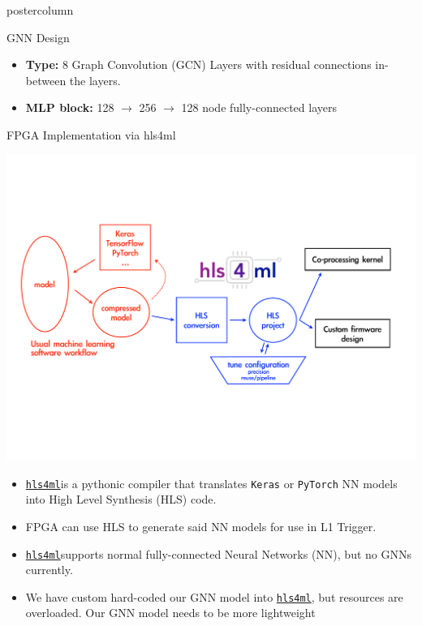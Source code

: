 \documentclass[final,hyperref={pdfpagelabels=false}]{beamer}
\newcommand{\hlsfml}{{\href{https://github.com/hls-fpga-machine-learning/hls4ml}{\texttt{hls4ml}}}}
\begin{document}
\begin{frame}
\begin{columns}
\begin{column}{.49\textwidth}
\begin{beamercolorbox}[center,wd=\textwidth]{postercolumn}
\begin{minipage}[T]{.95\textwidth}
{\begin{block}{GNN Design}
                \begin{itemize}
                \item \textbf{Type:} 8 Graph Convolution (GCN) Layers with residual connections in-between the layers.
                \item \textbf{MLP block:} 128 $\rightarrow$ 256 $\rightarrow$ 128 node fully-connected layers
                \end{itemize}
              \end{block}
            
            \begin{block}{FPGA Implementation via hls4ml}
             \begin{center}
                \includegraphics[width=0.8\linewidth]{flow-hls4ml.pdf}
              \end{center}
              \begin{itemize}
              \item \hlsfml\;is a pythonic compiler that translates  {\tt Keras} or {\tt PyTorch} NN models into High Level Synthesis (HLS) code.
              \item FPGA can use HLS to generate said NN models for use in L1 Trigger.
               \item \hlsfml\;supports normal fully-connected Neural Networks (NN), but no GNNs currently.
                \item We have custom hard-coded our GNN model into \hlsfml, but resources are overloaded. Our GNN model needs to be more lightweight
              \end{itemize}
             

\end{block}}
\end{minipage}
\end{beamercolorbox}
\end{column}
\end{columns}
\end{frame}
\end{document}
